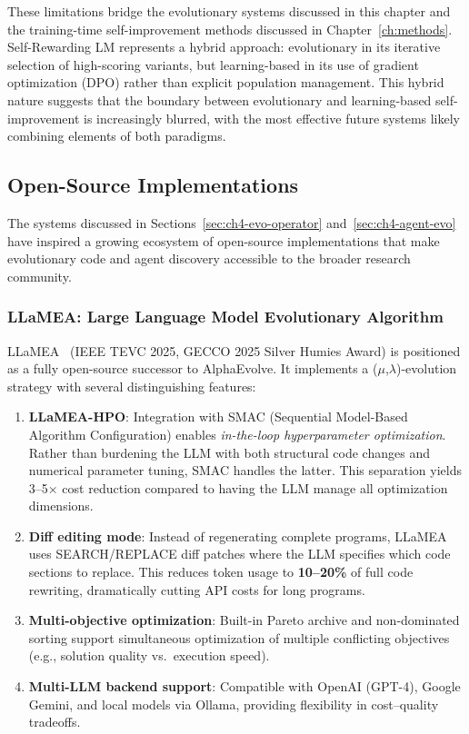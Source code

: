 These limitations bridge the evolutionary systems discussed in this chapter and the training-time self-improvement methods discussed in Chapter~\ref{ch:methods}. Self-Rewarding LM represents a hybrid approach: evolutionary in its iterative selection of high-scoring variants, but learning-based in its use of gradient optimization (DPO) rather than explicit population management. This hybrid nature suggests that the boundary between evolutionary and learning-based self-improvement is increasingly blurred, with the most effective future systems likely combining elements of both paradigms.


\subsection{Open-Source Implementations}
\label{sec:ch4-opensource}

The systems discussed in Sections~\ref{sec:ch4-evo-operator} and~\ref{sec:ch4-agent-evo} have inspired a growing ecosystem of open-source implementations that make evolutionary code and agent discovery accessible to the broader research community.

\subsubsection{LLaMEA: Large Language Model Evolutionary Algorithm}

LLaMEA~\citep{chen2025llamea} (IEEE TEVC 2025, GECCO 2025 Silver Humies Award) is positioned as a fully open-source successor to AlphaEvolve. It implements a ($\mu$,$\lambda$)-evolution strategy with several distinguishing features:

\begin{enumerate}
    \item \textbf{LLaMEA-HPO}: Integration with SMAC (Sequential Model-Based Algorithm Configuration) enables \emph{in-the-loop hyperparameter optimization}. Rather than burdening the LLM with both structural code changes and numerical parameter tuning, SMAC handles the latter. This separation yields 3--5$\times$ cost reduction compared to having the LLM manage all optimization dimensions.

    \item \textbf{Diff editing mode}: Instead of regenerating complete programs, LLaMEA uses SEARCH/REPLACE diff patches where the LLM specifies which code sections to replace. This reduces token usage to \textbf{10--20\%} of full code rewriting, dramatically cutting API costs for long programs.

    \item \textbf{Multi-objective optimization}: Built-in Pareto archive and non-dominated sorting support simultaneous optimization of multiple conflicting objectives (e.g., solution quality vs.\ execution speed).

    \item \textbf{Multi-LLM backend support}: Compatible with OpenAI (GPT-4), Google Gemini, and local models via Ollama, providing flexibility in cost--quality tradeoffs.
\end{enumerate}

